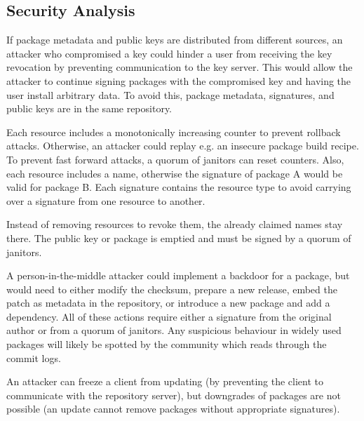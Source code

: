 \documentclass[nocopyrightspace]{sigplanconf}
\newcommand{\TODO}[1]{\textbf{[TODO: #1]}}
\begin{document}
\subsection{Security Analysis}

If package metadata and public keys are distributed from different sources, an attacker who compromised a key could hinder a user from receiving the key revocation by preventing communication to the key server.
This would allow the attacker to continue signing packages with the compromised key and having the user install arbitrary data.
To avoid this, package metadata, signatures, and public keys are in the same repository.

Each resource includes a monotonically increasing counter to prevent rollback attacks.
Otherwise, an attacker could replay e.g. an insecure package build recipe.
To prevent fast forward attacks, a quorum of janitors can reset counters.
Also, each resource includes a name, otherwise the signature of package A would be valid for package B.
Each signature contains the resource type to avoid carrying over a signature from one resource to another.

Instead of removing resources to revoke them, the already claimed names stay there.
The public key or package is emptied and must be signed by a quorum of janitors.

A person-in-the-middle attacker could implement a backdoor for a package, but would need to either modify the checksum, prepare a new release, embed the patch as metadata in the repository, or introduce a new package and add a dependency.
All of these actions require either a signature from the original author or from a quorum of janitors.
Any suspicious behaviour in widely used packages will likely be spotted by the community which reads through the commit logs.

An attacker can freeze a client from updating (by preventing the client to communicate with the repository server), but downgrades of packages are not possible (an update cannot remove packages without appropriate signatures).
\end{document}
